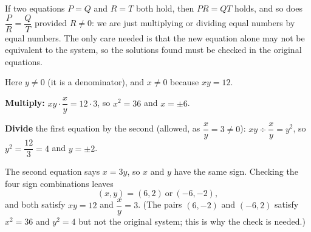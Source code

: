 If two equations $P=Q$ and $R=T$ both hold, then $PR=QT$ holds, and so does $\dfrac {P}{R}=\dfrac {Q}{T}$ provided $R\ne0$: we are just multiplying or dividing equal numbers by equal numbers. The only care needed is that the new equation alone may not be equivalent to the system, so the solutions found must be checked in the original equations.

Here $y\ne0$ (it is a denominator), and $x\ne0$ because $xy=12$.

\textbf{Multiply:} $xy\cdot\dfrac{x}{y}=12\cdot3$, so $x^2=36$ and $x=\pm6$.

\textbf{Divide} the first equation by the second (allowed, as $\dfrac {x}{y}=3\ne0$): $xy\div\dfrac {x}{y}=y^2$, so $y^2=\dfrac{12}{3}=4$ and $y=\pm2$.

The second equation says $x=3y$, so $x$ and $y$ have the same sign. Checking the four sign combinations leaves
\[
(x,y)=\boxed{(6,2)\ \text{or}\ (-6,-2)},
\]
and both satisfy $xy=12$ and $\dfrac {x}{y}=3$. (The pairs $(6,-2)$ and $(-6,2)$ satisfy $x^2=36$ and $y^2=4$ but not the original system; this is why the check is needed.)

